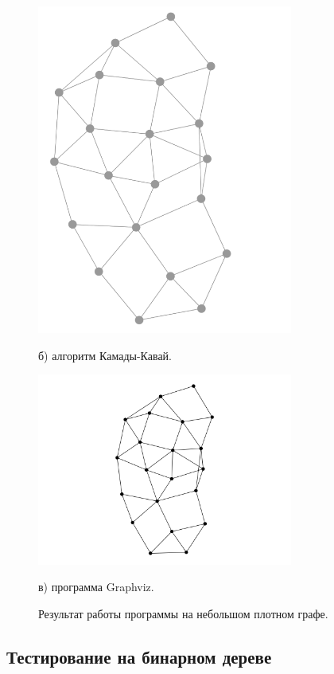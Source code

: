 \documentclass[14pt, russian]{scrartcl}
\begin{document}
\begin{figure}[H]
\begin{minipage}[t]{.50\textwidth}
\includegraphics[width=0.75\textwidth]{./imgs/kk_small_dense.png}
  \caption*{б) алгоритм Камады-Кавай.}
  \end{minipage}
  \begin{minipage}[t]{.55\textwidth}
  \centering
\includegraphics[width=0.75\textwidth]{./imgs/small_dense_gv.png}
  \caption*{в) программа Graphviz.}
  \end{minipage}
\caption{Результат работы программы на небольшом плотном графе.}
\label{fig:small_dense_res}
\end{figure}



\subsection{Тестирование на бинарном дереве}
\end{document}
